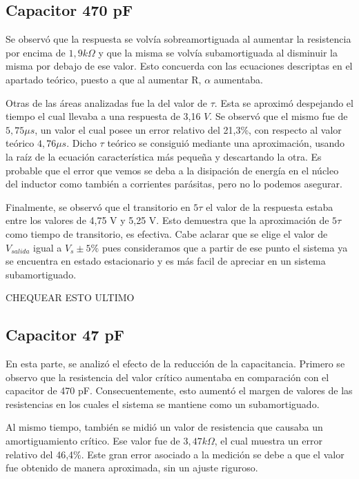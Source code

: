 \documentclass{article}
\begin{document}
        \subsection*{Capacitor 470 pF}
    	Se observó que la respuesta se volvía sobreamortiguada al aumentar la resistencia
     por encima de $1,9 k\Omega$ y que la misma se volvía subamortiguada al disminuir la misma por 
     debajo de ese valor. Esto concuerda con las ecuaciones descriptas en el apartado teórico, puesto 
     a que al aumentar R, $\alpha$ aumentaba. \par
	Otras de las áreas analizadas fue la del valor de $\tau$. Esta se aproximó despejando el tiempo 
    el cual llevaba a una respuesta de 3,16 $V$. Se observó que el mismo fue de $5,75 \mu s$, un valor
     el cual posee un error relativo del 21,3\%, con respecto al valor teórico $4,76 \mu s$. Dicho $\tau$
      teórico se consiguió mediante una aproximación, usando la raíz de la ecuación característica más pequeña 
      y descartando la otra. Es probable que el error que vemos se deba a la disipación de energía en el núcleo del inductor como también a corrientes parásitas, pero no lo podemos asegurar.\par
	Finalmente, se observó que el transitorio en $5\tau$ el valor de la respuesta estaba entre los
     valores de 4,75 V y 5,25 V. Esto demuestra que la aproximación de $5\tau$ como tiempo de 
     transitorio, es efectiva. Cabe aclarar que se elige el valor de $V_{salida}$ igual a $V_s \pm 5\%$ pues 
     consideramos que a partir de ese punto el sistema ya se encuentra en estado estacionario y es más facil de apreciar en un sistema subamortiguado.  \par CHEQUEAR ESTO ULTIMO 
	
	
        \subsection*{Capacitor 47 pF}
        En esta parte, se analizó el efecto de la reducción de la capacitancia. Primero se observo que la resistencia del valor crítico aumentaba en comparación con el capacitor de 470 pF. Consecuentemente, esto aumentó el margen de valores de las resistencias en los cuales el sistema se mantiene como un subamortiguado.\par
        Al mismo tiempo, también se midió un valor de resistencia que causaba un amortiguamiento crítico. Ese valor fue de $3,47 k\Omega$, el cual muestra un error relativo del 46,4\%. Este gran error asociado a la medición se debe a que el valor fue obtenido de manera aproximada, sin un ajuste riguroso.\par 
        
\end{document}
